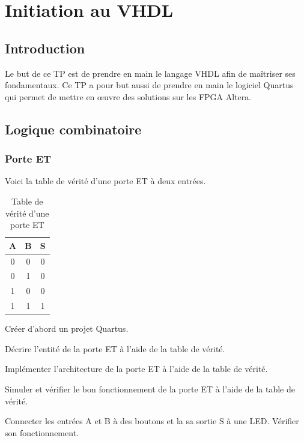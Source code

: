 \chapter*{Initiation au VHDL}
\setcounter{page}{1}
\section{Introduction}
Le but de ce TP est de prendre en main le langage VHDL afin de maîtriser ses fondamentaux. Ce TP a pour but aussi de prendre en main le logiciel Quartus qui permet de mettre en œuvre des solutions sur les FPGA Altera.
\section{Logique combinatoire}
\subsection{Porte ET}
Voici la table de vérité d'une porte ET à deux entrées.
\begin{table}[ht]
    \centering
    \begin{tabular}{c c|c} 
        A & B & S \\
        \hline
        0 & 0 & 0 \\
        0 & 1 & 0 \\
        1 & 0 & 0 \\
        1 & 1 & 1
    \end{tabular}
    \caption{Table de vérité d'une porte ET}
\end{table}

Créer d'abord un projet Quartus.

\medskip

Décrire l'entité de la porte ET à l'aide de la table de vérité.

\medskip

Implémenter l'architecture de la porte ET à l'aide de la table de vérité.

\medskip

Simuler et vérifier le bon fonctionnement de la porte ET à l'aide de la table de vérité.

\medskip

Connecter les entrées A et B à des boutons et la sa sortie S à une LED. Vérifier son fonctionnement.
